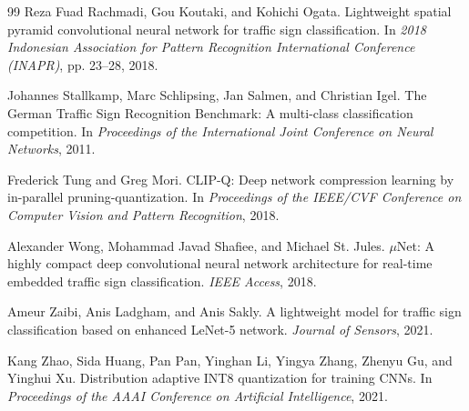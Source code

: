 \documentclass{article} %
\begin{document}
\begin{thebibliography}{99}
Reza Fuad Rachmadi, Gou Koutaki, and Kohichi Ogata.
\newblock Lightweight spatial pyramid convolutional neural network for traffic sign classification.
\newblock In \emph{2018 Indonesian Association for Pattern Recognition International Conference (INAPR)}, pp. 23--28, 2018.

Johannes Stallkamp, Marc Schlipsing, Jan Salmen, and Christian Igel.
\newblock The German Traffic Sign Recognition Benchmark: A multi-class classification competition.
\newblock In \emph{Proceedings of the International Joint Conference on Neural Networks}, 2011.

Frederick Tung and Greg Mori.
\newblock CLIP-Q: Deep network compression learning by in-parallel pruning-quantization.
\newblock In \emph{Proceedings of the IEEE/CVF Conference on Computer Vision and Pattern Recognition}, 2018.

Alexander Wong, Mohammad Javad Shafiee, and Michael St. Jules.
\newblock $\mu$Net: A highly compact deep convolutional neural network architecture for real-time embedded traffic sign classification.
\newblock \emph{IEEE Access}, 2018.

Ameur Zaibi, Anis Ladgham, and Anis Sakly.
\newblock A lightweight model for traffic sign classification based on enhanced LeNet-5 network.
\newblock \emph{Journal of Sensors}, 2021.

Kang Zhao, Sida Huang, Pan Pan, Yinghan Li, Yingya Zhang, Zhenyu Gu, and Yinghui Xu.
\newblock Distribution adaptive INT8 quantization for training CNNs.
\newblock In \emph{Proceedings of the AAAI Conference on Artificial Intelligence}, 2021.

\end{thebibliography}
\end{document}
